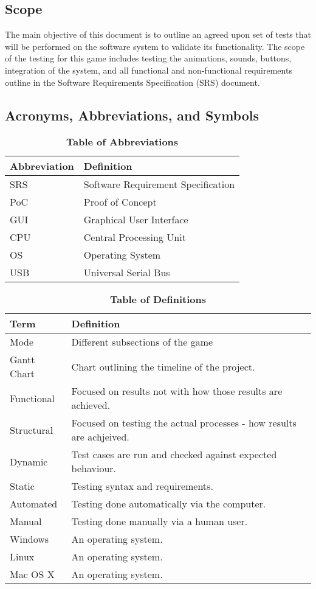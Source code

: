 \documentclass[12pt, titlepage]{article}
\begin{document}
\subsection{Scope}

\par The main objective of this document is to outline an agreed upon set of tests that will be performed on the software system to validate its functionality. The scope of the testing for this game includes testing the animations, sounds, buttons, integration of the system, and all functional and non-functional requirements outline in the Software Requirements Specification (SRS) document.


\subsection{Acronyms, Abbreviations, and Symbols}
	
\begin{table}[hbp]
\caption{\textbf{Table of Abbreviations}} \label{Table}
\begin{tabularx}{\textwidth}{p{3cm}X}
\toprule
\textbf{Abbreviation} & \textbf{Definition} \\
\midrule
SRS & Software Requirement Specification\\
PoC & Proof of Concept\\
GUI & Graphical User Interface\\
CPU & Central Processing Unit\\
OS & Operating System\\
USB & Universal Serial Bus\\

\bottomrule
\end{tabularx}
\end{table}


\begin{table}[!htbp]
\caption{\textbf{Table of Definitions}} \label{Table}
\begin{tabularx}{\textwidth}{p{3cm}X}
\toprule
\textbf{Term} & \textbf{Definition}\\
\midrule
Mode & Different subsections of the game\\
Gantt Chart & Chart outlining the timeline of the project.\\
Functional  & Focused on results not with how those results are achieved. \\
Structural & Focused on testing the actual processes - how results are achjeived.\\
Dynamic  & Test cases are run and checked against expected behaviour. \\
Static & Testing syntax and requirements.\\
Automated  & Testing done automatically via the computer.\\ 
Manual  & Testing done manually via a human user. \\
Windows & An operating system.\\
Linux & An operating system.\\
Mac OS X & An operating system.\\

\bottomrule
\end{tabularx}
\end{table}	
\end{document}
